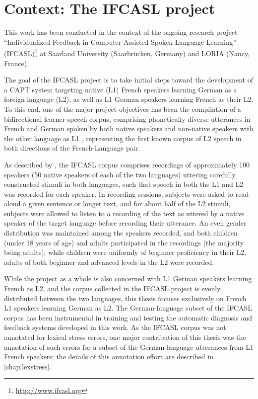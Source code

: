 \section{Context: The IFCASL project}
\label{sec:intro:ifcasl}

This work has been conducted in the context of the ongoing research project ``Individualized Feedback in Computer-Assisted Spoken Language Learning'' (IFCASL)\footnote{\url{http://www.ifcasl.org}} at Saarland University (Saarbrücken, Germany) and LORIA (Nancy, France). 

The goal of the IFCASL project is to take initial steps toward the development of a CAPT system targeting
native (L1) French speakers learning German as a foreign language (L2), 
as well as
L1 German speakers learning French as their L2. To this end, one of the major project objectives has been the compilation of a bidirectional learner speech corpus, comprising phonetically diverse utterances in French and German spoken by both native speakers and non-native speakers with the other language as L1 \citep{Fauth2014,Trouvain2013}, representing the first known corpus of L2 speech in both directions of the French-Language pair.

As described by \textcite{Trouvain2013,Fauth2014}, the IFCASL corpus comprises recordings of approximately 100 speakers (50 native speakers of each of the two languages) uttering carefully constructed stimuli in both languages, such that speech in both the L1 and L2 was recorded for each speaker. In recording sessions, subjects were asked to read aloud a given sentence or longer text, and for about half of the L2 stimuli, subjects were allowed to listen to a recording of the text as uttered by a native speaker of the target language before recording their utterance. An even gender distribution was maintained among the speakers recorded, and both children (under 18 years of age) and adults participated in the recordings (the majority being adults); while children were uniformly of beginner proficiency in their L2, adults of both beginner and advanced levels in the L2 were recorded. 

While the project as a whole is also concerned with L1 German speakers learning French as L2, and the corpus collected in the IFCASL project is evenly distributed between the two languages, this thesis focuses exclusively on French L1 speakers learning German as L2. 
The German-language subset of the IFCASL corpus has been instrumental in training and testing the automatic diagnosis and feedback systems developed in this work. As the IFCASL corpus was not annotated for lexical stress errors, one major contribution of this thesis was the annotation of such errors for a subset of the German-language utterances from L1 French speakers; the details of this annotation effort are described in \cref{chap:lexstress}. 

